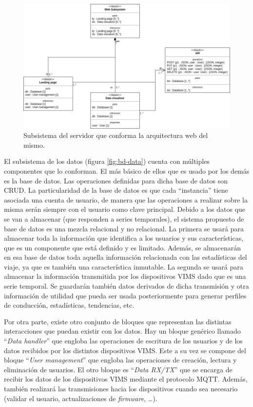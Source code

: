 \begin{figure}[H]
  \centering
  \includegraphics[width=.8\linewidth]{images/BD-web.png}
  \caption{Subsistema del servidor que conforma la arquitectura web del mismo.}
  \label{fig:bd-web}
\end{figure}

El subsistema de los datos (figura \ref{fig:bd-data}) cuenta con múltiples componentes
que lo conforman. El más básico de ellos que es usado por los demás es la base de datos.
Las operaciones definidas para dicha base de datos son \ac{CRUD}. La particularidad
de la base de datos es que cada ``instancia'' tiene asociada una cuenta de usuario,
de manera que las operaciones a realizar sobre la misma serán siempre con el usuario
como clave principal. Debido a los datos que se van a almacenar (que responden a
series temporales), el sistema propuesto de base de datos es una mezcla relacional y
no relacional. La primera se usará para almacenar toda la información que identifica
a los usuarios y sus características, que es un componente que está definido y es
limitado. Además, se almacenarán en esa base de datos toda aquella información
relacionada con las estadísticas del viaje, ya que es también una característica
inmutable. La segunda se usará para almacenar la información transmitida por los
dispositivos \ac{VIMS} dado que es una serie temporal. Se guardarán también datos
derivados de dicha transmisión y otra información de utilidad que pueda ser usada
posteriormente para generar perfiles de conducción, estadísticas, tendencias, etc.

Por otra parte, existe otro conjunto de bloques que representan las distintas
interacciones que puedan existir con los datos. Hay un bloque genérico llamado
``\textit{Data handler}'' que engloba las operaciones de escritura de los usuarios
y de los datos recibidos por los distintos dispositivos \ac{VIMS}. Este a su vez
se compone del bloque ``\textit{User management}'' que engloba las operaciones
de creación, lectura y eliminación de usuarios. El otro bloque es ``\textit{Data RX/TX}''
que se encarga de recibir los datos de los dispositivos \ac{VIMS} mediante el protocolo
MQTT. Además, también realizará las transmisiones hacia los dispositivos cuando
sea necesario (validar el usuario, actualizaciones de \textit{firmware}, \dots).

